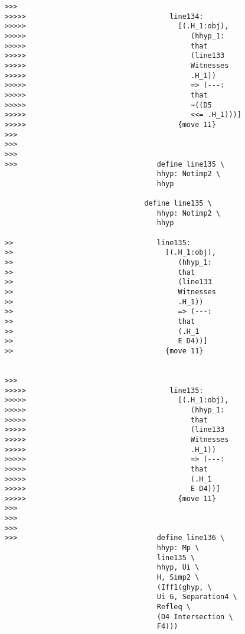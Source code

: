 \documentclass[12pt]{article}
\begin{document}
\begin{verbatim}
>>>
>>>>>                                  line134:
>>>>>                                    [(.H_1:obj),
>>>>>                                       (hhyp_1:
>>>>>                                       that
>>>>>                                       (line133
>>>>>                                       Witnesses
>>>>>                                       .H_1))
>>>>>                                       => (---:
>>>>>                                       that
>>>>>                                       ~((D5
>>>>>                                       <<= .H_1)))]
>>>>>                                    {move 11}
>>>
>>>
>>>
>>>                                 define line135 \
                                    hhyp: Notimp2 \
                                    hhyp

                                 define line135 \
                                    hhyp: Notimp2 \
                                    hhyp

>>                                  line135:
>>                                    [(.H_1:obj),
>>                                       (hhyp_1:
>>                                       that
>>                                       (line133
>>                                       Witnesses
>>                                       .H_1))
>>                                       => (---:
>>                                       that
>>                                       (.H_1
>>                                       E D4))]
>>                                    {move 11}


>>>
>>>>>                                  line135:
>>>>>                                    [(.H_1:obj),
>>>>>                                       (hhyp_1:
>>>>>                                       that
>>>>>                                       (line133
>>>>>                                       Witnesses
>>>>>                                       .H_1))
>>>>>                                       => (---:
>>>>>                                       that
>>>>>                                       (.H_1
>>>>>                                       E D4))]
>>>>>                                    {move 11}
>>>
>>>
>>>
>>>                                 define line136 \
                                    hhyp: Mp \
                                    line135 \
                                    hhyp, Ui \
                                    H, Simp2 \
                                    (Iff1(ghyp, \
                                    Ui G, Separation4 \
                                    Refleq \
                                    (D4 Intersection \
                                    F4)))


\end{verbatim}
\end{document}
